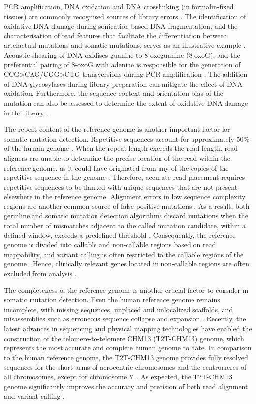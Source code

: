 PCR amplification, DNA oxidation and DNA crosslinking (in formalin-fixed tissues) are commonly recognised sources of library errors \cite{Chen2017-ba}. The identification of oxidative DNA damage during sonication-based DNA fragmentation, and the characterisation of read features that facilitate the differentiation between artefactual mutations and somatic mutations, serves as an illustrative example \cite{Costello2013-cz}. Acoustic shearing of DNA oxidises guanine to 8-oxoguanine (8-oxoG), and the preferential pairing of 8-oxoG with adenine \cite{Shibutani1991-tw} is responsible for the generation of CCG>CAG/CGG>CTG transversions during PCR amplification \cite{Costello2013-cz}. The addition of DNA glycosylases during library preparation can mitigate the effect of DNA oxidation. Furthermore, the sequence context and orientation bias of the mutation can also be assessed to determine the extent of oxidative DNA damage in the library \cite{Costello2013-cz}.

The repeat content of the reference genome is another important factor for somatic mutation detection. Repetitive sequences account for approximately 50\% of the human genome \cite{Lander2001-du}. When the repeat length exceeds the read length, read aligners are unable to determine the precise location of the read within the reference genome, as it could have originated from any of the copies of the repetitive sequence in the genome \cite{Li2008-dt}. Therefore, accurate read placement requires repetitive sequences to be flanked with unique sequences that are not present elsewhere in the reference genome. Alignment errors in low sequence complexity regions are another common source of false positive mutations \cite{Li2014-ra}. As a result, both germline and somatic mutation detection algorithms discard mutations when the total number of mismatches adjacent to the called mutation candidate, within a defined window, exceeds a predefined threshold \cite{Cibulskis2013-gw, DePristo2011-vf}. Consequently, the reference genome is divided into callable and non-callable regions based on read mappability, and variant calling is often restricted to the callable regions of the genome \cite{1000_Genomes_Project_Consortium2012-rj}. Hence, clinically relevant genes located in non-callable regions are often excluded from analysis \cite{Wagner2022-ph}.

The completeness of the reference genome is another crucial factor to consider in somatic mutation detection. Even the human reference genome remains incomplete, with missing sequences, unplaced and unlocalized scaffolds, and misassemblies such as erroneous sequence collapse and expansion \cite{Schneider2017-yo}. Recently, the latest advances in sequencing and physical mapping technologies have enabled the construction of the telomere-to-telomere CHM13 (T2T-CHM13) genome, which represents the most accurate and complete human genome to date.  In comparison to the human reference genome, the T2T-CHM13 genome provides fully resolved sequences for the short arms of acrocentric chromosomes and the centromeres of all chromosomes, except for chromosome Y \cite{Nurk2022-dv}. As expected, the T2T-CHM13 genome significantly improves the accuracy and precision of both read alignment and variant calling \cite{Aganezov2022-dv}.

